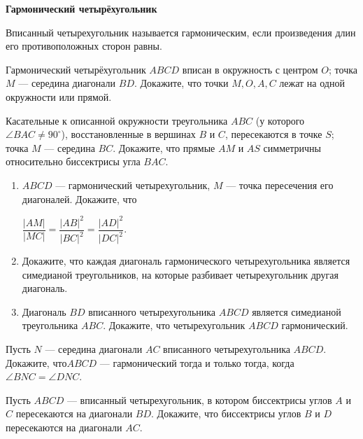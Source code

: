 \documentclass{article}
\begin{document}
    \large

    \begin{center}
        \textbf{Гармонический четырёхугольник}
    \end{center}

    \begin{definition}
        Вписанный четырехугольник называется гармоническим, если произведения длин
        его противоположных сторон равны.
    \end{definition}

    \begin{enumerate_boxed}

        \item Гармонический четырёхугольник $ABCD$ вписан в окружность с центром $O$; точка $M$ — середина диагонали $BD$.
        Докажите, что точки $M, O, A, C$ лежат на одной окружности или прямой.

        \item Касательные к описанной окружности треугольника $ABC$ (у которого $\angle BAC \neq 90^\circ$), восстановленные в вершинах $B$ и $C$, пересекаются в точке $S$; точка $M$ — середина $BC$.
        Докажите, что прямые $AM$ и $AS$ симметричны относительно биссектрисы угла $BAC$.

        \item
        \begin{enumerate}
            \item $ABCD$ — гармонический четырехугольник, $M$ — точка пересечения его диагоналей.
            Докажите, что

            $\dfrac{|AM|}{|MC|}=\dfrac{|AB|^2}{|BC|^2}=\dfrac{|AD|^2}{|DC|^2}.$
            \item Докажите, что каждая диагональ гармонического четырехугольника является симедианой
            треугольников, на которые разбивает четырехугольник другая диагональ.

            \item Диагональ $BD$ вписанного четырехугольника $ABCD$ является симедианой треугольника
            $ABC$.
            Докажите, что четырехугольник $ABCD$ гармонический.
        \end{enumerate}

        \item Пусть $N$ — середина диагонали $AC$ вписанного четырехугольника $ABCD$.
        Докажите, что$ABCD$ — гармонический тогда и только тогда, когда $\angle BNC = \angle DNC$.

        \item Пусть $ABCD$ — вписанный четырехугольник, в котором биссектрисы углов $A$ и $C$ пересекаются на диагонали $BD$.
        Докажите, что биссектрисы углов $B$ и $D$ пересекаются на диагонали $AC$.


\end{enumerate_boxed}
\end{document}

